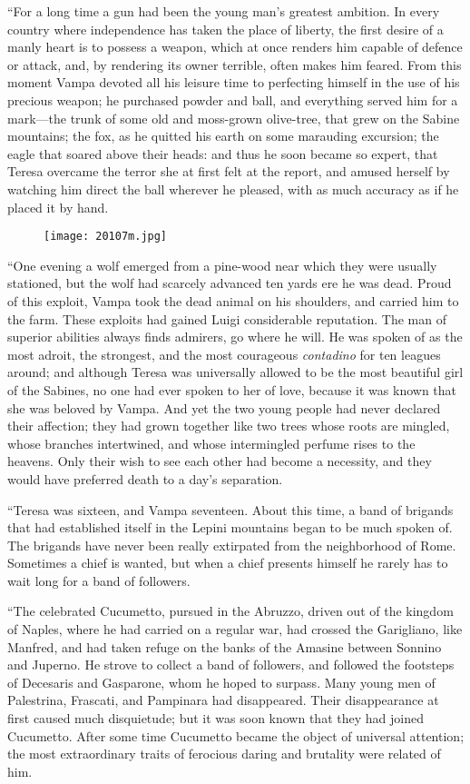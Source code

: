 “For a long time a gun had been the young man’s greatest ambition. In
every country where independence has taken the place of liberty, the
first desire of a manly heart is to possess a weapon, which at once
renders him capable of defence or attack, and, by rendering its owner
terrible, often makes him feared. From this moment Vampa devoted all
his leisure time to perfecting himself in the use of his precious
weapon; he purchased powder and ball, and everything served him for a
mark—the trunk of some old and moss-grown olive-tree, that grew on the
Sabine mountains; the fox, as he quitted his earth on some marauding
excursion; the eagle that soared above their heads: and thus he soon
became so expert, that Teresa overcame the terror she at first felt at
the report, and amused herself by watching him direct the ball wherever
he pleased, with as much accuracy as if he placed it by hand.

\begin{figure}[ht]
\texttt{[image: 20107m.jpg]}
\end{figure}

“One evening a wolf emerged from a pine-wood near which they were
usually stationed, but the wolf had scarcely advanced ten yards ere he
was dead. Proud of this exploit, Vampa took the dead animal on his
shoulders, and carried him to the farm. These exploits had gained Luigi
considerable reputation. The man of superior abilities always finds
admirers, go where he will. He was spoken of as the most adroit, the
strongest, and the most courageous \textit{contadino} for ten leagues around;
and although Teresa was universally allowed to be the most beautiful
girl of the Sabines, no one had ever spoken to her of love, because it
was known that she was beloved by Vampa. And yet the two young people
had never declared their affection; they had grown together like two
trees whose roots are mingled, whose branches intertwined, and whose
intermingled perfume rises to the heavens. Only their wish to see each
other had become a necessity, and they would have preferred death to a
day’s separation.

“Teresa was sixteen, and Vampa seventeen. About this time, a band of
brigands that had established itself in the Lepini mountains began to
be much spoken of. The brigands have never been really extirpated from
the neighborhood of Rome. Sometimes a chief is wanted, but when a chief
presents himself he rarely has to wait long for a band of followers.

“The celebrated Cucumetto, pursued in the Abruzzo, driven out of the
kingdom of Naples, where he had carried on a regular war, had crossed
the Garigliano, like Manfred, and had taken refuge on the banks of the
Amasine between Sonnino and Juperno. He strove to collect a band of
followers, and followed the footsteps of Decesaris and Gasparone, whom
he hoped to surpass. Many young men of Palestrina, Frascati, and
Pampinara had disappeared. Their disappearance at first caused much
disquietude; but it was soon known that they had joined Cucumetto.
After some time Cucumetto became the object of universal attention; the
most extraordinary traits of ferocious daring and brutality were
related of him.


